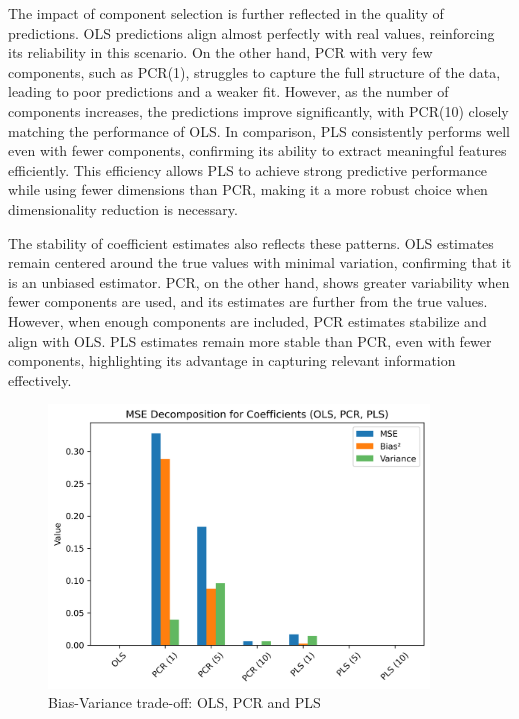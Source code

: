 \documentclass[11pt,twoside,a4paper]{article}
\begin{document}
The impact of component selection is further reflected in the quality of predictions. OLS predictions align almost perfectly with real values, reinforcing its reliability in this scenario. On the other hand, PCR with very few components, such as PCR(1), struggles to capture the full structure of the data, leading to poor predictions and a weaker fit. However, as the number of components increases, the predictions improve significantly, with PCR(10) closely matching the performance of OLS. In comparison, PLS consistently performs well even with fewer components, confirming its ability to extract meaningful features efficiently. This efficiency allows PLS to achieve strong predictive performance while using fewer dimensions than PCR, making it a more robust choice when dimensionality reduction is necessary.

The stability of coefficient estimates also reflects these patterns. OLS estimates remain centered around the true values with minimal variation, confirming that it is an unbiased estimator. PCR, on the other hand, shows greater variability when fewer components are used, and its estimates are further from the true values. However, when enough components are included, PCR estimates stabilize and align with OLS. PLS estimates remain more stable than PCR, even with fewer components, highlighting its advantage in capturing relevant information effectively.

\begin{figure}[H]
    \centering
    \includegraphics[width=0.9\textwidth]{Fifth_plot.png}
    \caption{Bias-Variance trade-off: OLS, PCR and PLS}
    \label{fig:PLS_analysis}
\end{figure}
\end{document}
